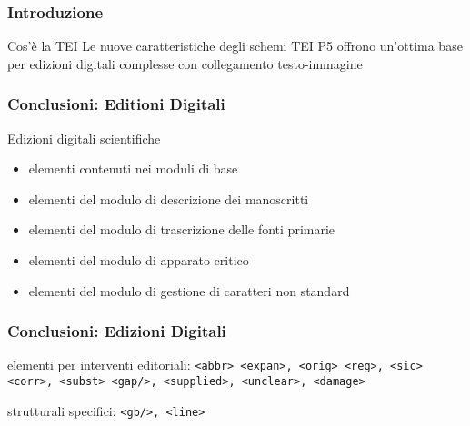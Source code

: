 \begin{frame}
    \frametitle{Introduzione}
    \addtocounter{nframe}{1}
    

    \begin{block}{Cos'è la TEI}
        Le nuove caratteristiche degli schemi TEI P5 offrono un’ottima base per edizioni digitali complesse con collegamento testo-immagine
    \end{block}
    
\end{frame}



\begin{frame}
    \frametitle{Conclusioni: Editioni Digitali}
    \addtocounter{nframe}{1}
    

    \begin{block}{Edizioni digitali scientifiche}
        \begin{itemize}
            \item elementi contenuti nei moduli di base
            \item elementi del modulo di descrizione dei manoscritti
            \item elementi del modulo di trascrizione delle fonti primarie
            \item elementi del modulo di apparato critico
            \item elementi del modulo di gestione di caratteri non standard
        \end{itemize}
    \end{block}
    
\end{frame}


\begin{frame}
    \frametitle{Conclusioni: Edizioni Digitali}
    \addtocounter{nframe}{1}
    

    \begin{block}{elementi per interventi editoriali:}
        \texttt{<abbr> <expan>, <orig> <reg>, <sic> <corr>, <subst>
        <gap/>, <supplied>, <unclear>, <damage>}
    \end{block}

    \begin{block}{strutturali specifici:}
        \texttt{<gb/>, <line>}
    \end{block}
    
\end{frame}



